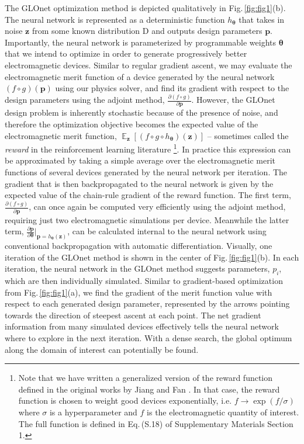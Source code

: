 \documentclass{article}
\DeclareMathOperator*{\EX}{\mathbb{E}}%
\begin{document}
The GLOnet optimization method is depicted qualitatively in Fig.\,\ref{fig:fig1}(b). The neural network is represented as a deterministic function $h_{\boldsymbol{\theta}}$ that takes in noise $\mathbf{z}$ from some known distribution $\text{D}$ and outputs design parameters $\mathbf{p}$. Importantly, the neural network is parameterized by programmable weights $\boldsymbol{\theta}$ that we intend to optimize in order to generate progressively better electromagnetic devices. Similar to regular gradient ascent, we may evaluate the electromagnetic merit function of a device generated by the neural network $(f\circ g)(\mathbf{p})$ using our physics solver, and find its gradient with respect to the design parameters using the adjoint method, $\frac{\partial (f\circ g)}{\partial \mathbf{p}}$. However, the GLOnet design problem is inherently stochastic because of the presence of noise, and therefore the optimization objective becomes the expected value of the electromagnetic merit function, $\EX_\mathbf{z}[(f\circ g\circ h_{\boldsymbol{\theta}})(\mathbf{z})]$ -- sometimes called the \textit{reward} in the reinforcement learning literature  \footnote{Note that we have written a generalized version of the reward function defined in the original works by Jiang and Fan \cite{jiang_global_2019, jiang_simulator-based_2020}. In that case, the reward function is chosen to weight good devices exponentially, i.e. $f\rightarrow \exp(f/\sigma)$ where $\sigma$ is a hyperparameter and $f$ is the electromagnetic quantity of interest. The full function is defined in Eq.\,(S.18) of Supplementary Materials Section 1.}. In practice this expression can be approximated by taking a simple average over the electromagnetic merit functions of several devices generated by the neural network per iteration. The gradient that is then backpropagated to the neural network is given by the expected value of the chain-rule gradient of the reward function. The first term, $\frac{\partial (f\circ g)}{\partial \mathbf{p}}$, can once again be computed very efficiently using the adjoint method, requiring just two electromagnetic simulations per device. Meanwhile the latter term, $\frac{\partial \mathbf{p}}{\partial \boldsymbol{\theta}}|_{\mathbf{p}=h_\mathbf{\theta}(\mathbf{z})}$, can be calculated internal to the neural network using conventional backpropagation with automatic differentiation. Visually, one iteration of the GLOnet method is shown in the center of Fig.\,\ref{fig:fig1}(b). In each iteration, the neural network in the GLOnet method suggests parameters, $p_i$, which are then individually simulated. Similar to gradient-based optimization from Fig.\,\ref{fig:fig1}(a), we find the gradient of the merit function value with respect to each generated design parameter, represented by the arrows pointing towards the direction of steepest ascent at each point. The net gradient information from many simulated devices effectively tells the neural network where to explore in the next iteration. With a dense search, the global optimum along the domain of interest can potentially be found.
\end{document}
